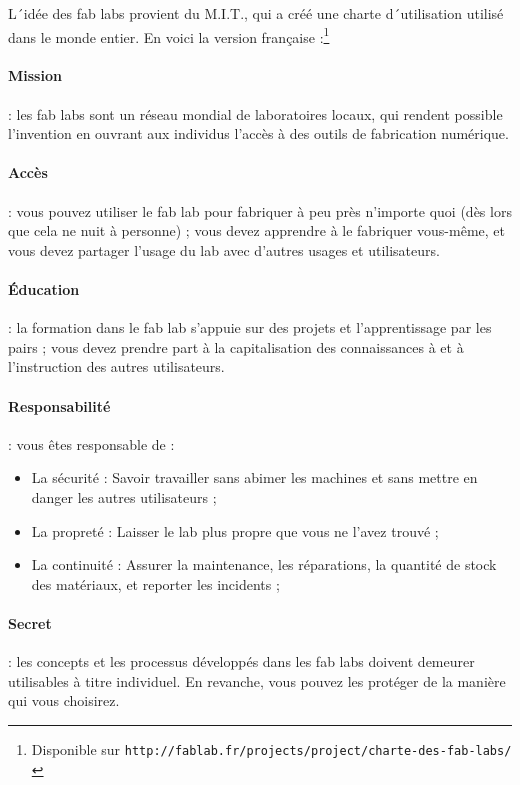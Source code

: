 
L´idée des fab labs provient du M.I.T., qui a créé une charte d´utilisation utilisé dans le monde entier. En voici la version française :\footnote{Disponible sur \texttt{http://fablab.fr/projects/project/charte-des-fab-labs/}}

\paragraph{Mission} : les fab labs sont un réseau mondial de laboratoires locaux, qui rendent possible l'invention en ouvrant aux individus l'accès à des outils de fabrication numérique.
 
\paragraph{Accès} : vous pouvez utiliser le fab lab pour fabriquer à peu près n'importe quoi (dès lors que cela ne nuit à personne) ; vous devez apprendre à le fabriquer vous-même, et vous devez partager l'usage du lab avec d'autres usages et utilisateurs.
 
\paragraph{Éducation} : la formation dans le fab lab s'appuie sur des projets et l'apprentissage par les pairs ; vous devez prendre part à la capitalisation des connaissances à et à l'instruction des autres utilisateurs.
 
\paragraph{Responsabilité} : vous êtes responsable de :
\begin{itemize}
  \item La sécurité : Savoir travailler sans abimer les machines et sans mettre en danger les autres utilisateurs ;
  \item La propreté : Laisser le lab plus propre que vous ne l'avez trouvé ;
  \item La continuité : Assurer la maintenance, les réparations, la quantité de stock des matériaux, et reporter les incidents ;
\end{itemize}

\paragraph{Secret} : les concepts et les processus développés dans les fab labs doivent demeurer utilisables à titre individuel. En revanche, vous pouvez les protéger de la manière qui vous choisirez.
 

